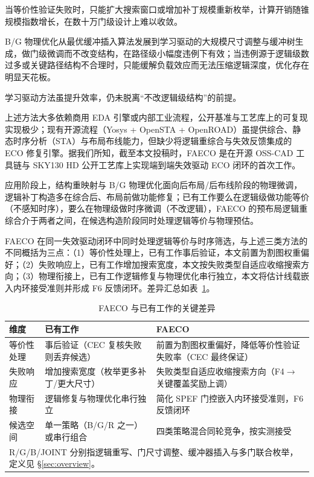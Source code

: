 \documentclass[journal]{IEEEtran}
\begin{document}
当等价性验证失败时，只能扩大搜索窗口或增加补丁规模重新枚举\cite{zhuo2018patch}，计算开销随锥规模指数增长，在数十万门级设计上难以收敛。

B/G 物理优化从最优缓冲插入算法\cite{liang2012buffer}发展到学习驱动的大规模尺寸调整与缓冲树生成\cite{liu2021rlsizer,huang2025phys,chen2024aito,zhang2025buffalo}，做门级微调而不改变结构，在路径级小幅度违例下有效；当违例源于逻辑级数过多或关键路径结构不合理时，只能缓解负载效应而无法压缩逻辑深度，优化存在明显天花板\cite{liu2021rlsizer,huang2025phys}。

学习驱动方法\cite{chen2024aito,zhang2025buffalo}虽提升效率，仍未脱离“不改逻辑级结构”的前提。

上述方法大多依赖商用 EDA 引擎或内部工业流程，公开基准与工艺库上的可复现实现极少；现有开源流程（Yosys + OpenSTA + OpenROAD）虽提供综合、静态时序分析（STA）与布局布线能力，但缺少将逻辑重综合与失效反馈集成的 ECO 修复引擎。据我们所知，截至本文投稿时，FAECO 是在开源 OSS-CAD 工具链与 SKY130 HD 公开工艺库上实现端到端失效驱动 ECO 闭环的首次工作。

应用阶段上，结构重映射与 B/G 物理优化面向后布局/后布线阶段的物理微调，逻辑补丁构造多在综合后、布局前做功能修复；已有工作要么在逻辑级做功能等价（不感知时序），要么在物理级做时序微调（不改逻辑），FAECO 的预布局逻辑重综合介于两者之间，在候选构造阶段同时处理逻辑等价与物理预估。

FAECO 在同一失效驱动闭环中同时处理逻辑等价与时序筛选，与上述三类方法的不同概括为三点：（1）等价性处理上，已有工作事后验证，本文前置为割图权重偏好；（2）失败响应上，已有工作增加搜索宽度，本文按失败类型自适应收缩搜索方向；（3）物理衔接上，已有工作逻辑修复与物理优化串行独立，本文将估计线载嵌入内环接受准则并形成 F6 反馈闭环。差异汇总如表~\ref{tab:related_diff}。

\begin{table}[!t]
\centering
\caption{FAECO 与已有工作的关键差异}
\label{tab:related_diff}
\footnotesize
\setlength{\tabcolsep}{3pt}
\begin{tabular}{p{2.2cm}p{2.8cm}p{3.2cm}}
\toprule
\textbf{维度} & \textbf{已有工作} & \textbf{FAECO} \\
\midrule
等价性处理 & 事后验证（CEC 复核失败则丢弃候选） & 前置为割图权重偏好，降低等价性验证失败率（CEC 最终保证） \\
失败响应 & 增加搜索宽度（枚举更多补丁/更大尺寸） & 失败类型自适应收缩搜索方向（F4$\to$关键覆盖奖励上调） \\
物理衔接 & 逻辑修复与物理优化串行独立 & 简化 SPEF 门控嵌入内环接受准则，F6 反馈闭环 \\
候选空间 & 单一策略（B/G/R 之一）或串行组合 & 四类策略混合同轮竞争，按实测接受 \\
\bottomrule
\multicolumn{3}{p{8.0cm}}{\footnotesize R/G/B/JOINT 分别指逻辑重写、门尺寸调整、缓冲器插入与多门联合枚举，定义见 \S\ref{sec:overview}。}\\
\end{tabular}
\end{table}
\end{document}

